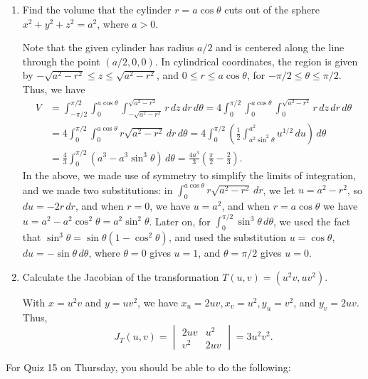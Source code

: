 \documentclass[letterpaper,12pt]{article}
\newcommand{\di}{\displaystyle}
\begin{document}
\begin{enumerate}
 \item Find the volume that the cylinder $r=a\cos\theta$ cuts out of the sphere $x^2+y^2+z^2=a^2$, where $a>0$.

\bigskip

Note that the given cylinder has radius $a/2$ and is centered along the line through the point $(a/2, 0, 0)$. In cylindrical coordinates, the region is given by $-\sqrt{a^2-r^2}\leq z\leq \sqrt{a^2-r^2}$, and $0\leq r\leq a\cos\theta$, for $-\pi/2\leq \theta\leq \pi/2$. Thus, we have
\begin{align*}
 V &= \int_{-\pi/2}^{\pi/2}\int_0^{a\cos\theta}\int_{-\sqrt{a^2-r^2}}^{\sqrt{a^2-r^2}}r \,dz\,dr\,d\theta = 4\int_0^{\pi/2}\int_0^{a\cos\theta}\int_0^{\sqrt{a^2-r^2}}r\,dz\,dr\,d\theta\\
& = 4\int_0^{\pi/2}\int_0^{a\cos\theta} r\sqrt{a^2-r^2}\,dr\,d\theta = 4\int_0^{\pi/2}\left(\frac{1}{2}\int_{a^2\sin^2\theta}^{a^2} u^{1/2}\,du\right)\,d\theta\\
& = \frac{4}{3}\int_0^{\pi/2}(a^3-a^3\sin^3\theta)\,d\theta = \frac{4a^3}{3}\left(\frac{\pi}{2}-\frac{2}{3}\right).
\end{align*}
In the above, we made use of symmetry to simplify the limits of integration, and we made two substitutions: in $\di \int_0^{a\cos\theta}r\sqrt{a^2-r^2}\,dr$, we let $u=a^2-r^2$, so $du = -2r\,dr$, and when $r=0$, we have $u=a^2$, and when $r=a\cos\theta$ we have $u=a^2-a^2\cos^2\theta = a^2\sin^2\theta$. Later on, for $\di \int_0^{\pi/2}\sin^3\theta\,d\theta$, we used the fact that $\sin^3\theta = \sin\theta(1-\cos^2\theta)$, and used the substitution $u=\cos\theta$, $du = -\sin\theta\,d\theta$, where $\theta=0$ gives $u=1$, and $\theta=\pi/2$ gives $u=0$.

 \item Calculate the Jacobian of the transformation $T(u,v) = (u^2v, uv^2)$.

With $x=u^2v$ and $y=uv^2$, we have $x_u = 2uv, x_v = u^2, y_u=v^2$, and $y_v = 2uv$. Thus,
\[
 J_T(u,v) = \begin{vmatrix}2uv & u^2\\v^2&2uv\end{vmatrix} = 3u^2v^2.
\]


\end{enumerate}



For Quiz 15 on Thursday, you should be able to do the following:
\end{document}
